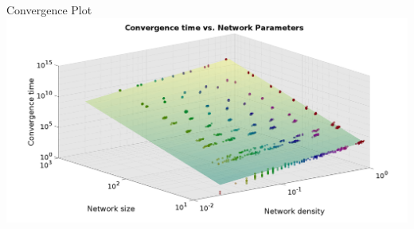\documentclass[10pt]{beamer}
\begin{document}

\begin{frame}{Convergence Plot}
    \centering
    \includegraphics[width=\textwidth]{png/convergence_3d_10-1000.png}
\end{frame}
\end{document}
